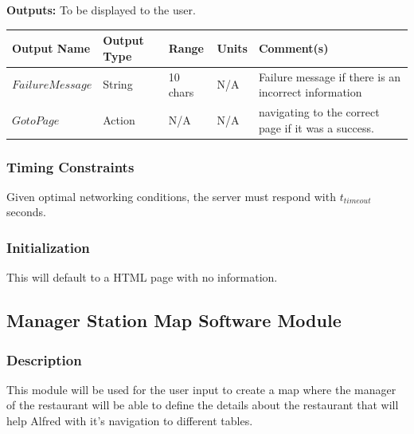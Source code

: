 \documentclass [10pt]{article}
\begin{document}
\textbf{Outputs: } To be displayed to the user.\newline
\begin{longtable}{|l|l|l|l|l|}\hline 
	\rowcolor{tableCell}\textbf{Output Name} & \textbf{Output Type} & \textbf{Range} & \textbf{Units} & \textbf{Comment(s)} \\ \hline
	$  FailureMessage $ & String & 10 chars & N/A & Failure message if there is an incorrect information  \\ \hline
	\rowcolor{tableCell}$  GotoPage $ & Action & N/A  & N/A & navigating to the correct page if it was a success. \\ \hline
\end{longtable}



\subsubsection{Timing Constraints}
Given optimal networking conditions, the server must respond with $ t_{timeout} $ seconds.


\subsubsection{Initialization}
This will default to a HTML page with no information.


\subsection{Manager Station Map Software Module}


\subsubsection{Description}
This module will be used for the user input to create a map where the manager of the restaurant will be able to define the details about the restaurant that will help Alfred with it's navigation to different tables.
\end{document}
